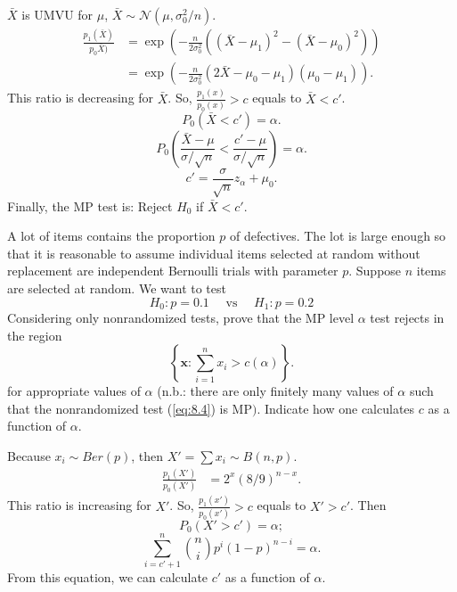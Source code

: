 \begin{solution}
    $\bar{X}$ is UMVU for $\mu$, $\bar{X}\sim \mathcal{N}(\mu, \sigma_0^2/n)$. 
    \[
        \begin{aligned}
            \frac{p_1(\bar{X})}{p_0\bar{X})}&=\exp\left(-\frac{n}{2\sigma_0^2}\left((\bar{X}-\mu_1)^2-(\bar{X}-\mu_0)^2\right)\right)\\
            &=\exp\left(-\frac{n}{2\sigma_0^2}(2\bar{X}-\mu_0-\mu_1)(\mu_0-\mu_1)\right). 
        \end{aligned}
    \]
    This ratio is decreasing  for $\bar{X}$. So, $\frac{p_1(x)}{p_0(x)}>c$ equals to $\bar{X}<c'$. 
    \[
        P_0(\bar{X}<c')=\alpha. 
    \]
    \[
        P_0\left(\frac{\bar{X}-\mu}{\sigma/\sqrt{n}}<\frac{c'-\mu}{\sigma/\sqrt{n}}\right)=\alpha. 
    \]
    \[
        c'=\frac{\sigma}{\sqrt{n}}z_\alpha+\mu_0. 
    \]
    Finally, the MP test is: Reject $H_0$ if $\bar{X}<c'$. 
\end{solution}

\begin{ex}
    A lot of items contains the proportion \(p\) of defectives. The lot is large enough so that it is reasonable to assume individual items selected at random without replacement are independent Bernoulli trials with parameter \(p\). Suppose \(n\) items are selected at random. We want to test
    \[
        H_{0}: p=0.1 \quad \text { vs } \quad H_{1}: p=0.2
    \]
    Considering only nonrandomized tests, prove that the MP level \(\alpha\) test rejects in the region
    \begin{equation}
        \label{eq:8.4}
        \left\{\mathbf{x}: \sum_{i=1}^{n} x_{i}>c(\alpha)\right\}. 
    \end{equation}
    for appropriate values of \(\alpha\) (n.b.: there are only finitely many values of \(\alpha\) such that the nonrandomized test (\ref{eq:8.4}) is \(\mathrm{MP})\). Indicate how one calculates \(c\) as a function of \(\alpha\). 
\end{ex}

\begin{solution}
    Because $x_i\sim Ber(p)$, then $X'=\sum x_i\sim B(n,p)$. 
    \begin{align*}
        \frac{p_1(X')}{p_0(X')}&=2^x(8/9)^{n-x}. 
    \end{align*}
    This ratio is increasing for $X'$. So, $\frac{p_1(x')}{p_0(x')}>c$ equals to $X'>c'$. Then
    \[
        P_0(X'>c')=\alpha; 
    \]
    \[
        \sum_{i=c'+1}^{n} \binom{n}{i}p^i(1-p)^{n-i}=\alpha.
    \]
    From this equation, we can calculate \(c'\) as a function of \(\alpha\). 
\end{solution}

